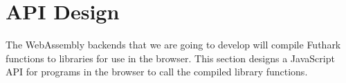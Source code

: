 \documentclass[11pt]{book}
\begin{document}



\chapter{API Design}


The WebAssembly backends that we are going to develop will compile Futhark functions to libraries for use in the browser. This section designs a JavaScript API for programs in the browser to call the compiled library functions.












\end{document}
